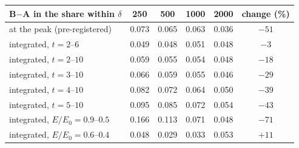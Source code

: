 \begin{tabular}{lccccc}
B$-$A in the share within $\delta$ & 250 & 500 & 1000 & 2000 & change (\%) \\
\hline
at the peak (pre-registered) & 0.073 & 0.065 & 0.063 & 0.036 & $-51$ \\
integrated, $t=2$--$6$ & 0.049 & 0.048 & 0.051 & 0.048 & $-3$ \\
integrated, $t=2$--$10$ & 0.059 & 0.055 & 0.054 & 0.048 & $-18$ \\
integrated, $t=3$--$10$ & 0.066 & 0.059 & 0.055 & 0.046 & $-29$ \\
integrated, $t=4$--$10$ & 0.082 & 0.072 & 0.064 & 0.050 & $-39$ \\
integrated, $t=5$--$10$ & 0.095 & 0.085 & 0.072 & 0.054 & $-43$ \\
integrated, $E/E_0=0.9$--$0.5$ & 0.166 & 0.113 & 0.071 & 0.048 & $-71$ \\
integrated, $E/E_0=0.6$--$0.4$ & 0.048 & 0.029 & 0.033 & 0.053 & $+11$ \\
\end{tabular}
